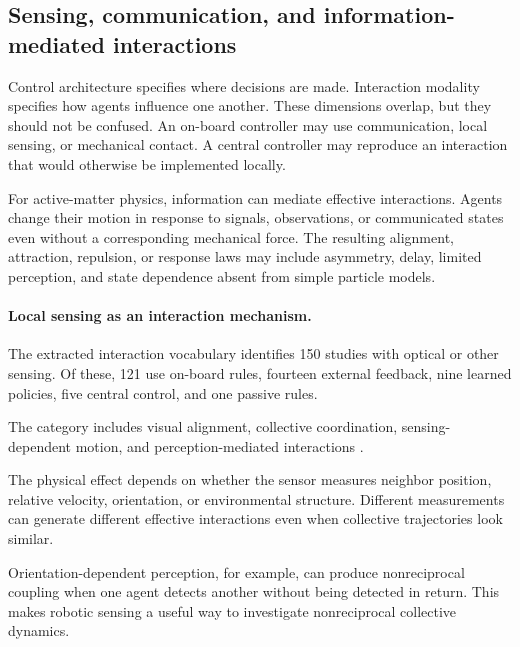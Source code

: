 \subsection{Sensing, communication, and information-mediated interactions}
\label{sec:control-information}

Control architecture specifies where decisions are made.
Interaction modality specifies how agents influence
one another. These dimensions overlap, but they
should not be confused. An on-board controller may
use communication, local sensing, or mechanical
contact. A central controller may reproduce an
interaction that would otherwise be implemented
locally.

For active-matter physics, information can mediate
effective interactions. Agents change their motion
in response to signals, observations, or communicated
states even without a corresponding mechanical force.
The resulting alignment, attraction, repulsion,
or response laws may include asymmetry, delay,
limited perception, and state dependence absent
from simple particle models.

\paragraph*{Local sensing as an interaction mechanism.}

The extracted interaction vocabulary identifies
150 studies with optical or other sensing.
Of these, 121 use on-board rules, fourteen external
feedback, nine learned policies, five
central control, and one passive rules.

The category includes visual alignment,
collective coordination, sensing-dependent
motion, and perception-mediated interactions
\cite{Schilling2019learningvisionbase,Choi2026communicationfreec,Wu2024adversarialimitatio,Liu2025collectivemotionmo,Zhu2025amillingswarmofg,Zhu2025fromspikestoswarm,Jia2025adeepreinforcement,Mijalkov2016engineeringsensoria,Castro2025visualcollectivebe,Zhou2025gazingpreferencein,Zheng2024emergenceofcollect,Zheng2025shapingcollectiveb,Li2026onfeedbackspeedco,Zhang2025learningefficientf,Kraus2026generativeadversari}.

The physical effect depends on whether
the sensor measures neighbor position,
relative velocity, orientation, or
environmental structure. Different
measurements can generate different
effective interactions even when
collective trajectories look similar.

Orientation-dependent perception, for example,
can produce nonreciprocal coupling when
one agent detects another without being
detected in return. This makes robotic
sensing a useful way to investigate
nonreciprocal collective dynamics.

